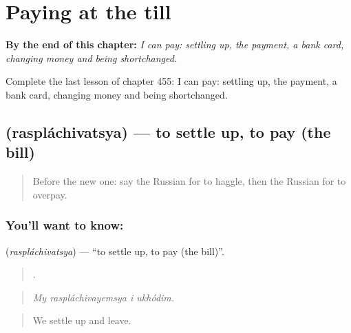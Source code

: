 
\chapter{Paying at the till}
\label{ch:ru-paying-at-the-till}

\begin{chapteropening}
\textbf{By the end of this chapter:} \emph{I can pay: settling up, the payment, a bank card, changing money and being shortchanged.}

Complete the last lesson of chapter 455: I can pay: settling up, the payment, a bank card, changing money and being shortchanged.
\end{chapteropening}

\section[\texorpdfstring{\ru{расплачиваться} (raspláchivatsya)}{расплачиваться (raspláchivatsya)}]{ (raspláchivatsya) — to settle up, to pay (the bill)}

\label{lesson:RU-C455-rasplachivatsya}



\begin{quote}
Before the new one: say the Russian for to haggle, then the Russian for to overpay.
\end{quote}

\subsection*{You'll want to know: }
\textbf{} (\emph{raspláchivatsya}) — \textquotedblleft{}to settle up, to pay (the bill)\textquotedblright{}.

\begin{quote}
   .
\end{quote}

\begin{quote}
\emph{My raspláchivayemsya i ukhódim.}
\end{quote}

\begin{quote}
We settle up and leave.
\end{quote}

